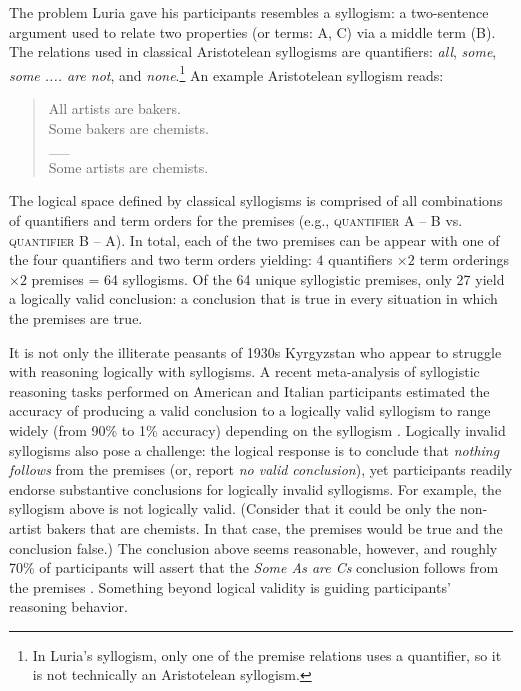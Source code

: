 \documentclass[floatsintext, doc]{apa6}
\begin{document}

The problem Luria gave his participants resembles a syllogism: a two-sentence argument used to relate two properties (or terms: A, C) via a middle term (B). 
The relations used in classical Aristotelean syllogisms are quantifiers: \emph{all}, \emph{some}, \emph{some .... are not}, and \emph{none}.\footnote{In Luria's syllogism, only one of the premise relations uses a quantifier, so it is not technically an Aristotelean syllogism.} 
An example Aristotelean syllogism reads:

\begin{quote}
All artists are bakers. \\
Some bakers are chemists. \\
\_\_ \\
Some artists are chemists.
\end{quote}

The logical space defined by classical syllogisms is comprised of all combinations of quantifiers and term orders for the premises (e.g., \textsc{quantifier} \textsc{A} -- \textsc{B} vs. \textsc{quantifier} \textsc{B} -- \textsc{A}).
In total, each of the two premises can be appear with one of the four quantifiers and two term orders yielding:  $4$ quantifiers  $\times 2$ term orderings $\times 2$ premises = 64 syllogisms.
Of the 64 unique syllogistic premises, only 27 yield a logically valid conclusion: a conclusion that is true in every situation in which the premises are true.

It is not only the illiterate peasants of 1930s Kyrgyzstan who appear to struggle with reasoning logically with syllogisms.
A recent meta-analysis of syllogistic reasoning tasks performed on American and Italian participants estimated the accuracy of producing a valid conclusion to a logically valid syllogism to range widely (from 90\% to 1\% accuracy) depending on the syllogism \cite{Khemlani2012}.
Logically invalid syllogisms also pose a challenge: the logical response is to conclude that \emph{nothing follows} from the premises (or, report \emph{no valid conclusion}), yet participants readily endorse substantive conclusions for logically invalid syllogisms. 
For example, the syllogism above is not logically valid.  (Consider that it could be only the non-artist bakers that are chemists. In that case, the premises would be true and the conclusion false.)
The conclusion above seems reasonable, however, and roughly 70\% of participants will assert that the \emph{Some As are Cs} conclusion follows from the premises  \cite{Khemlani2012}.
Something beyond logical validity is guiding participants' reasoning behavior. 
\end{document}
